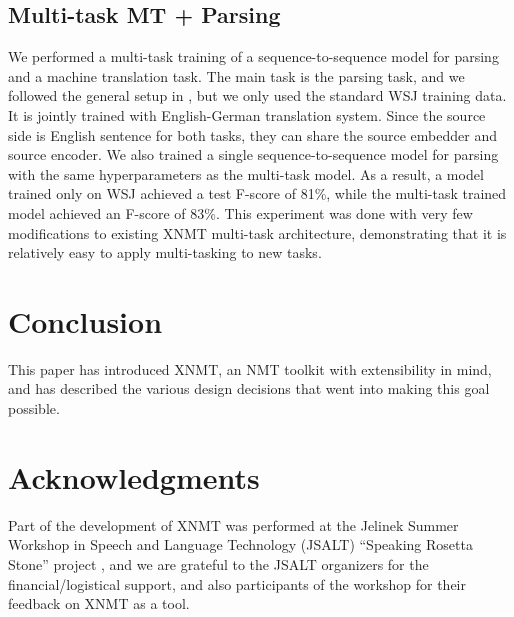 \documentclass[]{article}
\begin{document}
\subsection{Multi-task MT + Parsing}
\label{sec:expmultitask}
We performed a multi-task training of a sequence-to-sequence model for parsing  and a machine translation task. The main task is the parsing task, and we followed the general setup in \citep{VinyalsKKPSH15}, but we only used the standard WSJ training data. It is jointly trained with English-German translation system. Since the source side is English sentence for both tasks, they can share the source embedder and source encoder. We also trained a single sequence-to-sequence model for parsing with the same hyperparameters as the multi-task model. As a result, a model trained only on WSJ achieved a test F-score of 81\%, while the multi-task trained model achieved an F-score of 83\%. This experiment was done with very few modifications to existing XNMT multi-task architecture, demonstrating that it is relatively easy to apply multi-tasking to new tasks.

\section{Conclusion}

This paper has introduced XNMT, an NMT toolkit with extensibility in mind, and has described the various design decisions that went into making this goal possible.

\section*{Acknowledgments}

Part of the development of XNMT was performed at the Jelinek Summer Workshop in Speech and Language Technology (JSALT) ``Speaking Rosetta Stone'' project \citep{scharenborg18icassp}, and we are grateful to the JSALT organizers for the financial/logistical support, and also participants of the workshop for their feedback on XNMT as a tool.
\end{document}
